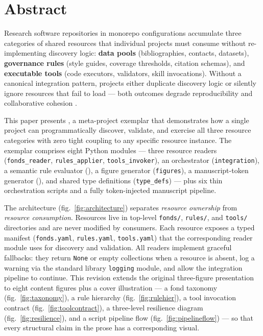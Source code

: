 \documentclass[
]{article}
\begin{document}
\newpage

\section{Abstract}\label{abstract}

Research software repositories in monorepo configurations accumulate
three categories of shared resources that individual projects must
consume without re-implementing discovery logic: \textbf{data pools}
(bibliographies, contacts, datasets), \textbf{governance rules} (style
guides, coverage thresholds, citation schemas), and \textbf{executable
tools} (code executors, validators, skill invocations). Without a
canonical integration pattern, projects either duplicate discovery logic
or silently ignore resources that fail to load --- both outcomes degrade
reproducibility and collaborative cohesion
\citep{Wilson2014best, Taschuk2017ten}.

This paper presents , a
meta-project exemplar that demonstrates how a single project can
programmatically discover, validate, and exercise all three resource
categories with zero tight coupling to any specific resource instance.
The exemplar comprises eight Python modules --- three resource readers
(\texttt{fonds\_reader}, \texttt{rules\_applier},
\texttt{tools\_invoker}), an orchestrator (\texttt{integration}), a
semantic rule evaluator (), a figure
generator (\texttt{figures}), a manuscript-token generator
(), and shared type definitions
(\texttt{type\_defs}) --- plus six thin orchestration scripts and a
fully token-injected manuscript pipeline.

The architecture (fig.~\ref{fig:architecture}) separates \emph{resource
ownership} from \emph{resource consumption}. Resources live in top-level
\texttt{fonds/}, \texttt{rules/}, and \texttt{tools/} directories and
are never modified by consumers. Each resource exposes a typed manifest
(\texttt{fonds.yaml}, \texttt{rules.yaml}, \texttt{tools.yaml}) that the
corresponding reader module uses for discovery and validation. All
readers implement graceful fallbacks: they return \texttt{None} or empty
collections when a resource is absent, log a warning via the standard
library \texttt{logging} module, and allow the integration pipeline to
continue. This revision extends the original three-figure presentation
to eight content figures plus a cover illustration --- a fond taxonomy
(fig.~\ref{fig:taxonomy}), a rule hierarchy (fig.~\ref{fig:rulehier}), a
tool invocation contract (fig.~\ref{fig:toolcontract}), a three-level
resilience diagram (fig.~\ref{fig:resilience}), and a script pipeline
flow (fig.~\ref{fig:pipelineflow}) --- so that every structural claim in
the prose has a corresponding visual.
\end{document}
